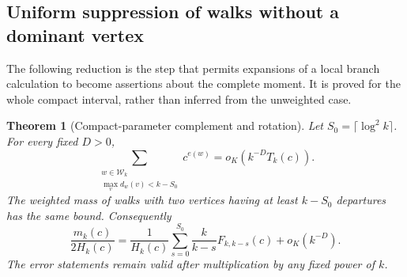 \documentclass[11pt,letterpaper]{article}
\newtheorem{theorem}{Theorem}[section]
\theoremstyle{remark}\newtheorem{remark}[theorem]{Remark}
\newcommand{\Wc}{\mathcal W}\newcommand{\Uc}{\mathcal U}\newcommand{\Part}{\operatorname{Part}}
\theoremstyle{definition}\newtheorem{definition}[theorem]{Definition}
\begin{document}
\subsection{Uniform suppression of walks without a dominant vertex}

The following reduction is the step that permits expansions of a local
branch calculation to become assertions about the complete moment.
It is proved for the whole compact interval, rather than inferred
from the unweighted case.

\begin{theorem}[Compact-parameter complement and rotation]
\label{sgm:md:cm:complement}
Let \(S_0=\lceil\log^2k\rceil\). For every fixed \(D>0\),
\begin{equation}\label{sgm:md:cm:complement-bound}
 \sum_{\substack{w\in\Wc_k\\
          \max_v d_w(v)<k-S_0}}c^{e(w)}
 =o_K(k^{-D}T_k(c)).
\end{equation}
The weighted mass of walks with two vertices having at least
\(k-S_0\) departures has the same bound. Consequently
\begin{equation}\label{sgm:md:cm:rotation-reduction}
 \frac{m_k(c)}{2H_k(c)}
 =\frac1{H_k(c)}\sum_{s=0}^{S_0}
       \frac{k}{k-s}F_{k,k-s}(c)+o_K(k^{-D}).
\end{equation}
The error statements remain valid after multiplication by any fixed
power of \(k\).
\end{theorem}
\end{document}
